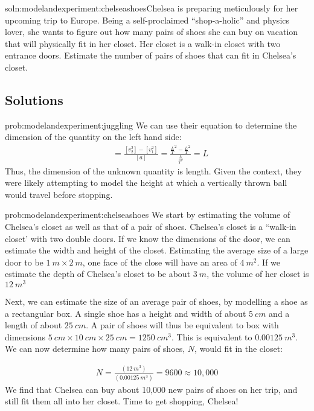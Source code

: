 \begin{problem}{soln:modelandexperiment:chelseashoes}{\label{prob:modelandexperiment:chelseashoes}Chelsea is preparing meticulously for her upcoming trip to Europe. Being a self-proclaimed ``shop-a-holic'' and physics lover, she wants to figure out how many pairs of shoes she can buy on vacation that will physically fit in her closet. Her closet is a walk-in closet with two entrance doors. Estimate the number of pairs of shoes that can fit in Chelsea's closet.}
\end{problem}

\subsection{Solutions}

\begin{solution}{prob:modelandexperiment:juggling}\label{soln:modelandexperiment:juggling}
We can use their equation to determine the dimension of the quantity on the left hand side:
\begin{align*}
[?]&=\frac{[v_2^{2}]-[v_1^{2}]}{[a]}=\frac{\frac{L}{T}^{2}-\frac{L}{T}^{2}}{\frac{L}{T^{2}}}= L
\end{align*}
Thus, the dimension of the unknown quantity is length. Given the context, they were likely attempting to model the height at which a vertically thrown ball would travel before stopping.\end{solution}

\begin{solution}{prob:modelandexperiment:chelseashoes}\label{soln:modelandexperiment:chelseashoes}
We start by estimating the volume of Chelsea's closet as well as that of a pair of shoes. Chelsea's closet is a ``walk-in closet' with two double doors. If we know the dimensions of the door, we can estimate the width and height of the closet. Estimating the average size of a large door to be $\SI{1}{m}\times \SI{2}{m}$, one face of the close will have an area of $\SI{4}{m^2}$. If we estimate the depth of Chelsea's closet to be about $\SI{3}{m}$, the volume of her closet is $\SI{12}{m^3}$

Next, we can estimate the size of an average pair of shoes, by modelling a shoe as a rectangular box. A single shoe has a height and width of about $\SI{5}{cm}$ and a length of about $\SI{25}{cm}$. A pair of shoes will thus be equivalent to box with dimensions $\SI{5}{cm} \times \SI{10}{cm} \times \SI{25}{cm} = \SI{1250}{cm^3}$. This is equivalent to $\SI{0.00125}{m^3}$. We can now determine how many pairs of shoes, $N$, would fit in the closet:

\begin{align*}
N=\frac{(\SI{12}{m^3})}{(\SI{0.00125}{m^3})}= 9600\approx 10,000 
\end{align*}
We find that Chelsea can buy about 10,000 new pairs of shoes on her trip, and still fit them all into her closet. Time to get shopping, Chelsea!
\end{solution}
